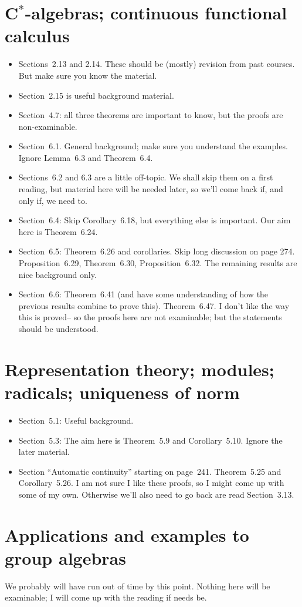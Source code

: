 \documentclass[twoside,12pt,a4paper]{article}
\begin{document}
\section{C$^*$-algebras; continuous functional calculus}

\begin{itemize}
\item Sections~2.13 and 2.14.  These should be (mostly) revision from
past courses.  But make sure you know the material.
\item Section~2.15 is useful background material.
\item Section~4.7: all three theorems are important to know, but the proofs
are non-examinable.
\item Section~6.1.  General background; make sure you understand the
examples.  Ignore Lemma~6.3 and Theorem~6.4.
\item Sections~6.2 and 6.3 are a little off-topic.  We shall skip them
on a first reading, but material here will be needed later, so we'll
come back if, and only if, we need to.
\item Section~6.4: Skip Corollary~6.18, but everything else is important.
Our aim here is Theorem~6.24.
\item Section~6.5: Theorem~6.26 and corollaries.  Skip long discussion
on page 274.  Proposition~6.29, Theorem~6.30, Proposition~6.32.
The remaining results are nice background only.
\item Section~6.6: Theorem~6.41 (and have some understanding of how the
previous results combine to prove this).  Theorem~6.47.  I don't like
the way this is proved-- so the proofs here are not examinable; but the
statements should be understood.
\end{itemize}


\section{Representation theory; modules; radicals; uniqueness of norm}

\begin{itemize}
\item Section~5.1: Useful background.
\item Section~5.3: The aim here is Theorem~5.9 and Corollary~5.10.
Ignore the later material.
\item Section ``Automatic continuity'' starting on page~241.
Theorem~5.25 and Corollary~5.26.  I am not sure I like these proofs, so
I might come up with some of my own.  Otherwise we'll also need to go
back are read Section~3.13.
\end{itemize}


\section{Applications and examples to group algebras}

We probably will have run out of time by this point.  Nothing here
will be examinable; I will come up with the reading if needs be.
\end{document}
